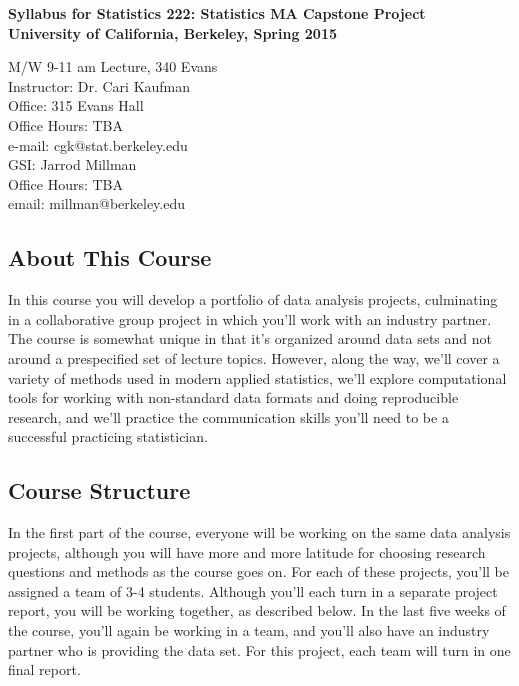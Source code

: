 \documentclass[11pt]{article}
\begin{document}
{\bf \Large Syllabus for Statistics 222: Statistics MA Capstone Project\\
University of California, Berkeley, Spring 2015}

\vspace{2em}

M/W 9-11 am Lecture, 340 Evans\\

Instructor: Dr. Cari Kaufman\\
Office: 315 Evans Hall\\
Office Hours: TBA\\
e-mail: cgk@stat.berkeley.edu\\

GSI: Jarrod Millman\\
Office Hours: TBA\\
email: millman@berkeley.edu

\subsection*{About This Course}

In this course you will develop a portfolio of data analysis projects, culminating in a collaborative group project in which you'll work with an industry partner. The course is somewhat unique in that it's organized around data sets and not around a prespecified set of lecture topics. However, along the way, we'll cover a variety of methods used in modern applied statistics, we'll explore computational tools for working with non-standard data formats and doing reproducible research, and we'll practice the communication skills you'll need to be a successful practicing statistician. 

\subsection*{Course Structure}

In the first part of the course, everyone will be working on the same data analysis projects, although you will have more and more latitude for choosing research questions and methods as the course goes on. For each of these projects, you'll be assigned a team of 3-4 students. Although you'll each turn in a separate project report, you will be working together, as described below. In the last five weeks of the course, you'll again be working in a team, and you'll also have an industry partner who is providing the data set. For this project, each team will turn in one final report.
\end{document}
